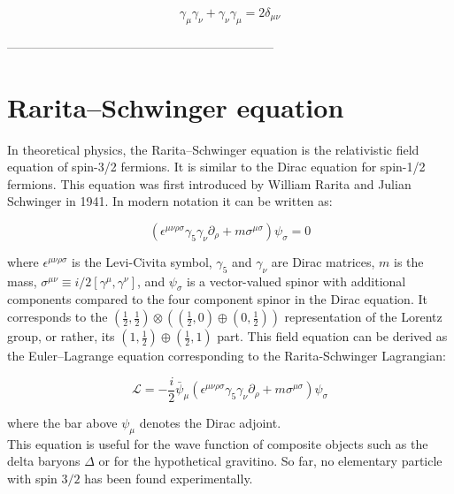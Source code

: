 \begin{equation}
   \gamma_{\mu}\gamma_{\nu} + \gamma_{\nu}\gamma_{\mu} = 2\delta_{\mu\nu}
\end{equation}


-----------------------------------------------------------------

\section{Rarita–Schwinger equation}

In theoretical physics, the Rarita–Schwinger equation is the relativistic field equation of spin-3/2 fermions. It is similar to the Dirac equation for spin-1/2 fermions. This equation was first introduced by William Rarita and Julian Schwinger in 1941. In modern notation it can be written as:

\begin{equation} \label{eq:Rarita–Schwingerequation}
   \left( \epsilon^{\mu \nu \rho \sigma} \gamma_5 \gamma_\nu \partial_\rho + m \sigma^{\mu \sigma} \right)\psi_\sigma = 0
\end{equation}

where $\epsilon^{\mu \nu \rho \sigma}$ is the Levi-Civita symbol, $\gamma_5$ and $\gamma_{\nu}$ are Dirac matrices, $m$ is the mass, $\sigma^{\mu \nu} \equiv i/2\left[ \gamma^{\mu} , \gamma^{\nu} \right]$, and $\psi_{\sigma}$ is a vector-valued spinor with additional components compared to the four component spinor in the Dirac equation. It corresponds to the $\left(\tfrac{1}{2},\tfrac{1}{2}\right)\otimes \left(\left(\tfrac{1}{2},0\right)\oplus \left(0,\tfrac{1}{2}\right)\right)$ representation of the Lorentz group, or rather, its $\left(1,\tfrac{1}{2}\right) \oplus \left(\tfrac{1}{2},1 \right)$ part. This field equation can be derived as the Euler–Lagrange equation corresponding to the Rarita-Schwinger Lagrangian:

\begin{equation}
   \mathcal{L} =-\frac{i}{2}\bar{\psi}_\mu \left( \epsilon^{\mu \nu \rho \sigma} \gamma_5 \gamma_{\nu} \partial_{\rho} + m \sigma^{\mu \sigma} \right)\psi_\sigma
\end{equation}

where the bar above $\psi_{\mu}$ denotes the Dirac adjoint.\\

This equation is useful for the wave function of composite objects such as the delta baryons $\Delta$ or for the hypothetical gravitino. So far, no elementary particle with spin $3/2$ has been found experimentally.\\

